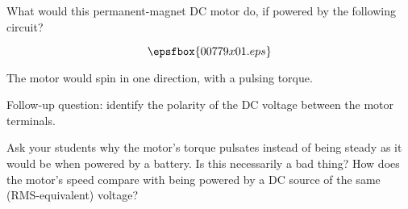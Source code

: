 

What would this permanent-magnet DC motor do, if powered by the following circuit?

$$\epsfbox{00779x01.eps}$$







The motor would spin in one direction, with a pulsing torque.

\vskip 10pt

Follow-up question: identify the polarity of the DC voltage between the motor terminals.







Ask your students why the motor's torque pulsates instead of being steady as it would be when powered by a battery.  Is this necessarily a bad thing?  How does the motor's speed compare with being powered by a DC source of the same (RMS-equivalent) voltage?





